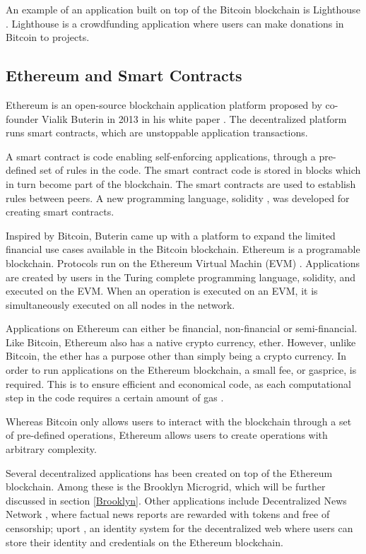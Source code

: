An example of an application built on top of the Bitcoin blockchain is Lighthouse \cite{lighthouse}. Lighthouse is a crowdfunding application where users can make donations in Bitcoin to projects. 

\subsection{Ethereum and Smart Contracts}
Ethereum is an open-source blockchain application platform \cite{ethereum.org} proposed by co-founder Vialik Buterin \cite{Buterin} in 2013 in his white paper \cite{ether_white_paper}. The decentralized platform runs smart contracts, which are unstoppable application transactions.  

A smart contract is code enabling self-enforcing applications, through a pre-defined set of rules in the code. The smart contract code is stored in blocks which in turn become part of the blockchain. The smart contracts are used to establish rules between peers. A new programming language, solidity \cite{ethereum_docs}, was developed for creating smart contracts.

Inspired by Bitcoin, Buterin came up with a platform to expand the limited financial use cases available in the Bitcoin blockchain. Ethereum is a programable blockchain. Protocols run on the Ethereum Virtual Machin (EVM) \cite{ethereum_docs}. Applications are created by users in the Turing complete programming language, solidity, and executed on the EVM. When an operation is executed on an EVM, it is simultaneously executed on all nodes in the network.

Applications on Ethereum can either be financial, non-financial or semi-financial. Like Bitcoin, Ethereum also has a native crypto currency, ether. However, unlike Bitcoin, the ether has a purpose other than simply being a crypto currency. In order to run applications on the Ethereum blockchain, a small fee, or gasprice, is required. This is to ensure efficient and economical code, as each computational step in the code requires a certain amount of gas \cite{ether_white_paper}.

Whereas Bitcoin only allows users to interact with the blockchain through a set of pre-defined operations, Ethereum allows users to create operations with arbitrary complexity.

Several decentralized applications has been created on top of the Ethereum blockchain. Among these is the Brooklyn Microgrid, which will be further discussed in section \ref{Brooklyn}. Other applications include Decentralized News Network \cite{DNN}, where factual news reports are rewarded with tokens and free of censorship; uport \cite{uport}, an identity system for the decentralized web where users can store their identity and credentials on the Ethereum blockchain.

